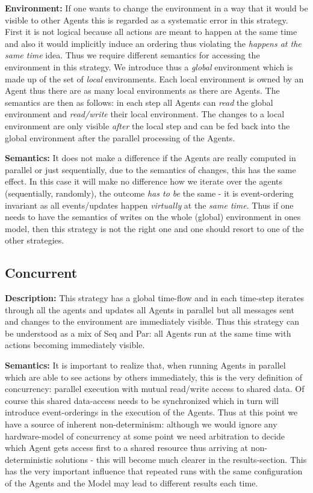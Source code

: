 \textbf{Environment:} If one wants to change the environment in a way that it would be visible to other Agents this is regarded as a systematic error in this strategy. First it is not logical because all actions are meant to happen at the same time and also it would implicitly induce an ordering thus violating the \textit{happens at the same time} idea. Thus we require different semantics for accessing the environment in this strategy. We introduce thus a \textit{global} environment which is made up of the set of \textit{local} environments. Each local environment is owned by an Agent thus there are as many local environments as there are Agents. The semantics are then as follows: in each step all Agents can \textit{read} the global environment and \textit{read/write} their local environment. The changes to a local environment are only visible \textit{after} the local step and can be fed back into the global environment after the parallel processing of the Agents.

\textbf{Semantics:} It does not make a difference if the Agents are really computed in parallel or just sequentially, due to the semantics of changes, this has the same effect. In this case it will make no difference how we iterate over the agents (sequentially, randomly), the outcome \textit{has to be} the same - it is event-ordering invariant as all events/updates happen \textit{virtually} at the \textit{same time}. Thus if one needs to have the semantics of writes on the whole (global) environment in ones model, then this strategy is not the right one and one should resort to one of the other strategies.

		
\subsection{Concurrent}
\textbf{Description:} This strategy has a global time-flow and in each time-step iterates through all the agents and updates all Agents in parallel but all messages sent and changes to the environment are immediately visible. Thus this strategy can be understood as a mix of Seq and Par: all Agents run at the same time with actions becoming immediately visible.

\textbf{Semantics:} It is important to realize that, when running Agents in parallel which are able to see actions by others immediately, this is the very definition of concurrency: parallel execution with mutual read/write access to shared data. Of course this shared data-access needs to be synchronized which in turn will introduce event-orderings in the execution of the Agents. Thus at this point we have a source of inherent non-determinism: although we would ignore any hardware-model of concurrency at some point we need arbitration to decide which Agent gets access first to a shared resource thus arriving at non-deterministic solutions - this will become much clearer in the results-section. This has the very important influence that repeated runs with the same configuration of the Agents and the Model may lead to different results each time.


